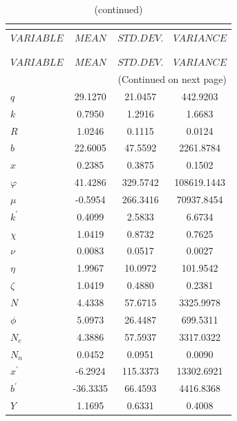  
\begin{center}
\begin{longtable}{lccc} 
\caption{THEORETICAL MOMENTS}\\
 \label{Table:th_moments}\\
\toprule 
$VARIABLE  $	 & 	 $           MEAN$	 & 	 $      STD. DEV.$	 & 	 $       VARIANCE$\\
\midrule \endfirsthead 
\caption{(continued)}\\
 \toprule \\ 
$VARIABLE  $	 & 	 $           MEAN$	 & 	 $      STD. DEV.$	 & 	 $       VARIANCE$\\
\midrule \endhead 
\midrule \multicolumn{4}{r}{(Continued on next page)} \\ \bottomrule \endfoot 
\bottomrule \endlastfoot 
$q         $	 & 	        29.1270	 & 	        21.0457	 & 	       442.9203 \\ 
$k         $	 & 	         0.7950	 & 	         1.2916	 & 	         1.6683 \\ 
$R         $	 & 	         1.0246	 & 	         0.1115	 & 	         0.0124 \\ 
$b         $	 & 	        22.6005	 & 	        47.5592	 & 	      2261.8784 \\ 
$x         $	 & 	         0.2385	 & 	         0.3875	 & 	         0.1502 \\ 
$\varphi   $	 & 	        41.4286	 & 	       329.5742	 & 	    108619.1443 \\ 
$\mu       $	 & 	        -0.5954	 & 	       266.3416	 & 	     70937.8454 \\ 
$k^\prime  $	 & 	         0.4099	 & 	         2.5833	 & 	         6.6734 \\ 
$\chi      $	 & 	         1.0419	 & 	         0.8732	 & 	         0.7625 \\ 
$\nu       $	 & 	         0.0083	 & 	         0.0517	 & 	         0.0027 \\ 
$\eta      $	 & 	         1.9967	 & 	        10.0972	 & 	       101.9542 \\ 
$\zeta     $	 & 	         1.0419	 & 	         0.4880	 & 	         0.2381 \\ 
$N         $	 & 	         4.4338	 & 	        57.6715	 & 	      3325.9978 \\ 
$\phi      $	 & 	         5.0973	 & 	        26.4487	 & 	       699.5311 \\ 
$N_e       $	 & 	         4.3886	 & 	        57.5937	 & 	      3317.0322 \\ 
$N_n       $	 & 	         0.0452	 & 	         0.0951	 & 	         0.0090 \\ 
$x^\prime  $	 & 	        -6.2924	 & 	       115.3373	 & 	     13302.6921 \\ 
$b^\prime  $	 & 	       -36.3335	 & 	        66.4593	 & 	      4416.8368 \\ 
$Y         $	 & 	         1.1695	 & 	         0.6331	 & 	         0.4008 \\ 
\end{longtable}
 \end{center}
